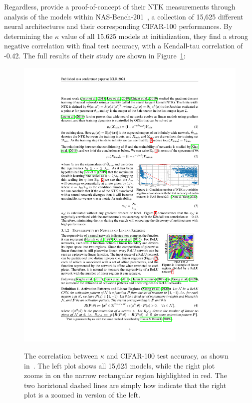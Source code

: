 Regardless, \citeauthor{chen2021} provide a proof-of-concept of their NTK measurements through analysis of the models within
NAS-Bench-201~\citep{dong2020}, a collection of 15,625 different
neural architectures and their corresponding CIFAR-100 performances. By determining the $\kappa$ value of all 15,625 models
at initialization, they find a strong negative correlation with final test accuracy, with a Kendall-tau correlation
of -0.42. The full results of their study are shown in Figure~\ref{fig:ntk}:

\begin{figure}[ht]
    \centering
	\includegraphics[width=\textwidth]{ntk} \\
	\caption[The correlation between $\kappa$ and CIFAR-100 test accuracy]{The correlation between $\kappa$ and CIFAR-100 test accuracy, as shown in~\cite{chen2021}. The left
    plot shows all 15,625 models, while the right plot zooms in on the narrow rectangular region highlighted in red.
    The two horiztonal dashed lines are simply how \citeauthor{chen2021} indicate that the right plot is a zoomed in version of the left.}
    \label{fig:ntk}
\end{figure}

